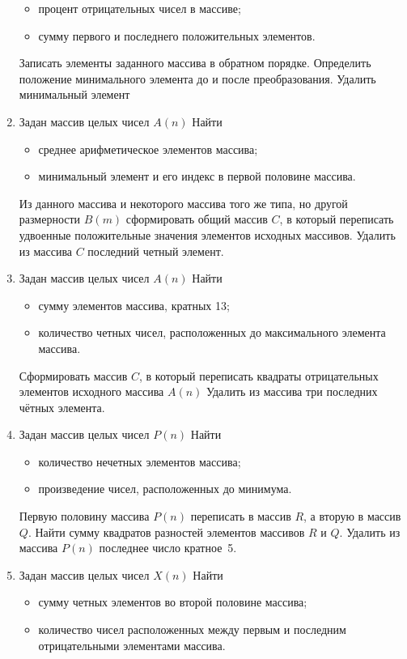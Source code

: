 \begin{enumerate}
\begin{itemize}
\item процент отрицательных чисел в массиве;
\item сумму первого и последнего положительных элементов.
\end{itemize}
Записать элементы заданного массива в обратном порядке. Определить положение минимального элемента до и после
преобразования. Удалить минимальный элемент
\item Задан массив целых чисел $A(n)$ Найти
\begin{itemize}
\item среднее арифметическое элементов массива;
\item минимальный элемент и его индекс в первой половине массива.
\end{itemize}
Из данного массива и некоторого массива того же типа, но другой размерности $B(m)$
сформировать общий массив $C$, в который переписать удвоенные положительные значения элементов исходных
массивов. Удалить из массива $C$ последний четный элемент.
\item Задан массив целых чисел $A(n)$ Найти
\begin{itemize}
\item сумму элементов массива, кратных 13;
\item количество четных чисел, расположенных до максимального элемента массива.
\end{itemize}
Сформировать массив $C$, в который переписать квадраты отрицательных элементов исходного массива
$A(n)$ Удалить из массива три последних чётных элемента.
\item Задан массив целых чисел $P(n)$ Найти
\begin{itemize}
\item количество нечетных элементов массива;
\item произведение чисел, расположенных до минимума.
\end{itemize}
Первую половину массива $P(n)$ переписать в массив $R$, а вторую в
массив $Q$. Найти сумму квадратов разностей элементов массивов $R$ и
$Q$. Удалить из массива $P(n)$ последнее число кратное~5.
\item Задан массив целых чисел $X(n)$ Найти
\begin{itemize}
\item сумму четных элементов во второй половине массива;
\item количество чисел расположенных между первым и последним отрицательными элементами массива.
\end{itemize}

\end{enumerate}
